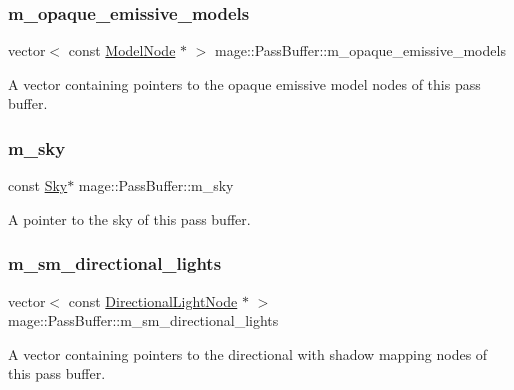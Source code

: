 \subsubsection{\texorpdfstring{m\+\_\+opaque\+\_\+emissive\+\_\+models}{m\_opaque\_emissive\_models}}
{\footnotesize\ttfamily vector$<$ const \hyperlink{classmage_1_1_model_node}{Model\+Node} $\ast$ $>$ mage\+::\+Pass\+Buffer\+::m\+\_\+opaque\+\_\+emissive\+\_\+models\hspace{0.3cm}{\ttfamily [private]}}

A vector containing pointers to the opaque emissive model nodes of this pass buffer. \hypertarget{structmage_1_1_pass_buffer_a19d0163dbfe7e60c664fdf433d47146b}{}\label{structmage_1_1_pass_buffer_a19d0163dbfe7e60c664fdf433d47146b} 
\subsubsection{\texorpdfstring{m\+\_\+sky}{m\_sky}}
{\footnotesize\ttfamily const \hyperlink{structmage_1_1_sky}{Sky}$\ast$ mage\+::\+Pass\+Buffer\+::m\+\_\+sky\hspace{0.3cm}{\ttfamily [private]}}

A pointer to the sky of this pass buffer. \hypertarget{structmage_1_1_pass_buffer_aa1161b50d505260607bda900f6856e0b}{}\label{structmage_1_1_pass_buffer_aa1161b50d505260607bda900f6856e0b} 
\subsubsection{\texorpdfstring{m\+\_\+sm\+\_\+directional\+\_\+lights}{m\_sm\_directional\_lights}}
{\footnotesize\ttfamily vector$<$ const \hyperlink{namespacemage_a7637b5351fc0f66a10badd80ebb35899}{Directional\+Light\+Node} $\ast$ $>$ mage\+::\+Pass\+Buffer\+::m\+\_\+sm\+\_\+directional\+\_\+lights\hspace{0.3cm}{\ttfamily [private]}}

A vector containing pointers to the directional with shadow mapping nodes of this pass buffer. \hypertarget{structmage_1_1_pass_buffer_a49209cf46f4e6c2328eb8a36d647a2d9}{}\label{structmage_1_1_pass_buffer_a49209cf46f4e6c2328eb8a36d647a2d9} 
